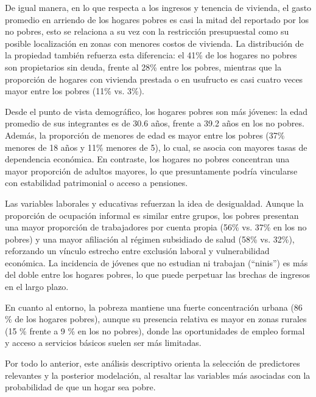 De igual manera, en lo que respecta a los ingresos y tenencia de vivienda, el gasto promedio en arriendo de los hogares pobres es casi la mitad del reportado por los no pobres, esto se relaciona a su vez con la restricción presupuestal como su posible localización en zonas con menores costos de vivienda. La distribución de la propiedad también refuerza esta diferencia: el 41\% de los hogares no pobres son propietarios sin deuda, frente al 28\% entre los pobres, mientras que la proporción de hogares con vivienda prestada o en usufructo es casi cuatro veces mayor entre los pobres (11\% vs. 3\%).

Desde el punto de vista demográfico, los hogares pobres son más jóvenes: la edad promedio de sus integrantes es de 30.6 años, frente a 39.2 años en los no pobres. Además, la proporción de menores de edad es mayor entre los pobres (37\% menores de 18 años y 11\% menores de 5), lo cual, se asocia con mayores tasas de dependencia económica. En contraste, los hogares no pobres concentran una mayor proporción de adultos mayores, lo que presuntamente podría vincularse con estabilidad patrimonial o acceso a pensiones.

Las variables laborales y educativas refuerzan la idea de desigualdad. Aunque la proporción de ocupación informal es similar entre grupos, los pobres presentan una mayor proporción de trabajadores por cuenta propia (56\% vs. 37\% en los no pobres) y una mayor afiliación al régimen subsidiado de salud (58\% vs. 32\%), reforzando un vínculo estrecho entre exclusión laboral y vulnerabilidad económica. La incidencia de jóvenes que no estudian ni trabajan (“ninis”) es más del doble entre los hogares pobres, lo que puede perpetuar las brechas de ingresos en el largo plazo.

En cuanto al entorno, la pobreza mantiene una fuerte concentración urbana (86 \% de los hogares pobres), aunque su presencia relativa es mayor en zonas rurales (15 \% frente a 9 \% en los no pobres), donde las oportunidades de empleo formal y acceso a servicios básicos suelen ser más limitadas.

Por todo lo anterior, este análisis descriptivo orienta la selección de predictores relevantes y la posterior modelación, al resaltar las variables más asociadas con la probabilidad de que un hogar sea pobre.

